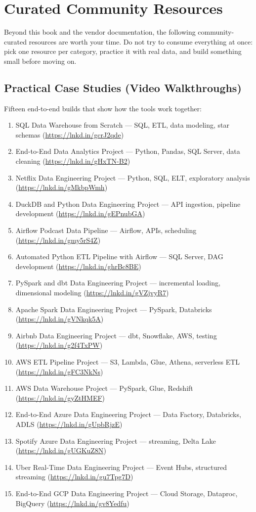 \section{Curated Community Resources}
%
Beyond this book and the vendor documentation, the following community-curated resources are worth your time. Do not try to consume everything at once: pick one resource per category, practice it with real data, and build something small before moving on.

\subsection*{Practical Case Studies (Video Walkthroughs)}
Fifteen end-to-end builds that show how the tools work together:
\begin{enumerate}
    \item SQL Data Warehouse from Scratch --- SQL, ETL, data modeling, star schemas (\url{https://lnkd.in/gcrJ2qde})
    \item End-to-End Data Analytics Project --- Python, Pandas, SQL Server, data cleaning (\url{https://lnkd.in/gHxTN-B2})
    \item Netflix Data Engineering Project --- Python, SQL, ELT, exploratory analysis (\url{https://lnkd.in/gMkbpWmh})
    \item DuckDB and Python Data Engineering Project --- API ingestion, pipeline development (\url{https://lnkd.in/gEPnubGA})
    \item Airflow Podcast Data Pipeline --- Airflow, APIs, scheduling (\url{https://lnkd.in/gmy5rS4Z})
    \item Automated Python ETL Pipeline with Airflow --- SQL Server, DAG development (\url{https://lnkd.in/ghrBc8BE})
    \item PySpark and dbt Data Engineering Project --- incremental loading, dimensional modeling (\url{https://lnkd.in/gVZjvyR7})
    \item Apache Spark Data Engineering Project --- PySpark, Databricks (\url{https://lnkd.in/gVNkqk5A})
    \item Airbnb Data Engineering Project --- dbt, Snowflake, AWS, testing (\url{https://lnkd.in/g2f4TxPW})
    \item AWS ETL Pipeline Project --- S3, Lambda, Glue, Athena, serverless ETL (\url{https://lnkd.in/gFC3NkNs})
    \item AWS Data Warehouse Project --- PySpark, Glue, Redshift (\url{https://lnkd.in/gyZtHMEF})
    \item End-to-End Azure Data Engineering Project --- Data Factory, Databricks, ADLS (\url{https://lnkd.in/gUpbRjzE})
    \item Spotify Azure Data Engineering Project --- streaming, Delta Lake (\url{https://lnkd.in/gUGKuZ8N})
    \item Uber Real-Time Data Engineering Project --- Event Hubs, structured streaming (\url{https://lnkd.in/gu7Tpg7D})
    \item End-to-End GCP Data Engineering Project --- Cloud Storage, Dataproc, BigQuery (\url{https://lnkd.in/gv8Yedfu})
\end{enumerate}

